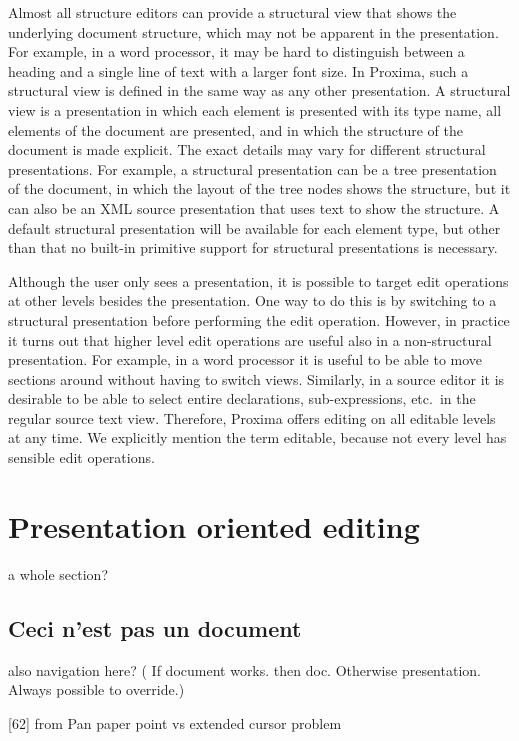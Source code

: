 Almost all structure editors can provide a structural view that shows the underlying document structure, which may not be apparent in the presentation. For example, in a word processor, it may be hard to distinguish between a heading and a single line of text with a larger font size. In Proxima, such a structural view is defined in the same way as any other presentation. A structural view is a presentation in which each element is presented with its type name, all elements of the document are presented, and in which the structure of the document is made explicit. The exact details may vary for different structural presentations. For example, a structural presentation can be a tree presentation of the document, in which the layout of the tree nodes shows the structure, but it can also be an XML source presentation that uses text to show the structure. A default structural presentation will be available for each element type, but other than that no built-in primitive support for structural presentations is necessary.

Although the user only sees a presentation, it is possible to target edit operations at other levels besides the presentation. One way to do this is by switching to a structural presentation before performing the edit operation. However, in practice it turns out that higher level edit operations are useful also in a non-structural presentation. For example, in a word processor it is useful to be able to move sections around without having to switch views. Similarly, in a source editor it is desirable to be able to select entire declarations, sub-expressions, etc.\ in the regular source text view. Therefore, Proxima offers editing on all editable levels at any time. We explicitly mention the term editable, because not every level has sensible edit operations. 

\bc
\section{Presentation oriented editing}
a whole section?

\subsection{Ceci n'est pas un document}

also navigation here? ( If document works. then doc. Otherwise presentation. Always  possible to override.)

[62] from Pan paper point vs extended cursor problem

